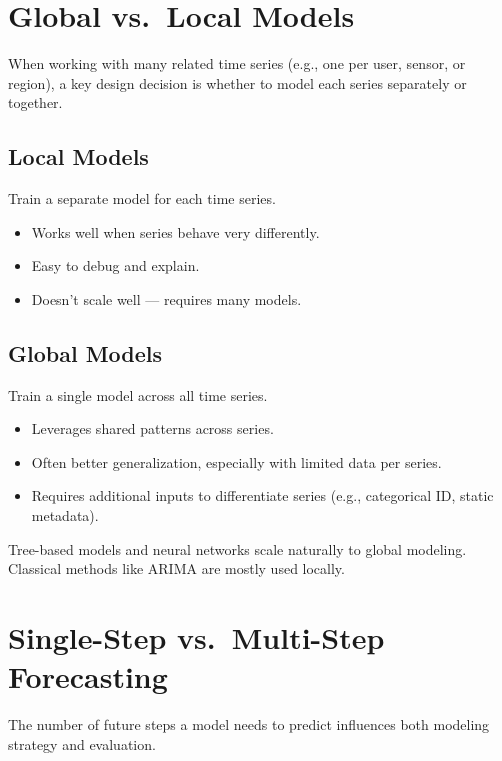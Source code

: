 \documentclass[12pt,openany, draft]{book}
\begin{document}
\section{Global vs.\ Local Models}

When working with many related time series (e.g., one per user, sensor, or region), a key design decision is whether to model each series separately or together.


\subsection*{Local Models}

Train a separate model for each time series.

\begin{itemize}
    \item Works well when series behave very differently.
    \item Easy to debug and explain.
    \item Doesn’t scale well — requires many models.
\end{itemize}


\subsection*{Global Models}

Train a single model across all time series.

\begin{itemize}
    \item Leverages shared patterns across series.
    \item Often better generalization, especially with limited data per series.
    \item Requires additional inputs to differentiate series (e.g., categorical ID, static metadata).
\end{itemize}

\begin{notebox}
Tree-based models and neural networks scale naturally to global modeling. Classical methods like ARIMA are mostly used locally.
\end{notebox}



\section{Single-Step vs.\ Multi-Step Forecasting}

The number of future steps a model needs to predict influences both modeling strategy and evaluation.
\end{document}
